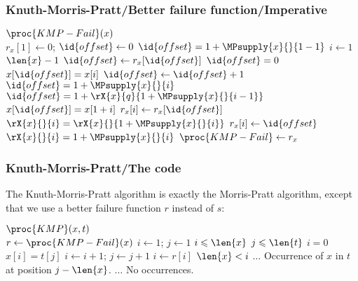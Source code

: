 %
\begin{frame}
\frametitle{Knuth-Morris-Pratt/Better failure function/Imperative}

{\small
\begin{codebox}
\(\proc{KMP-Fail} (x)\)\\
\li \(r_{x}[1] \gets 0\); \(\id{offset} \gets 0\)
    \RComment \(\id{offset} = 1 + \MPsupply{x}{}{1-1}\)
\li \For \(i \gets 1\) \To \(\len{x}-1\) 
\li \Do \Repeat
\li       \(\id{offset} \gets r_{x}[\id{offset}]\)
\li     \Until \(\id{offset} = 0\) \LogOr \(x[\id{offset}] = x[i]\)
\li     \(\id{offset} \gets \id{offset} + 1\)
        \RComment \(\id{offset} = 1 + \MPsupply{x}{}{i}\)
\li     \RComment \(\id{offset} = 1 + \rX{x}{q}{1+\MPsupply{x}{}{i-1}}\)
\li     \If \(x[\id{offset}] = x[1+i]\)
\li     \Then \(r_{x}[i] \gets r_{x}[\id{offset}]\)
              \RComment \(\rX{x}{}{i} = \rX{x}{}{1+\MPsupply{x}{}{i}}\)
\li     \Else \(r_{x}[i] \gets \id{offset}\)
              \RComment \(\rX{x}{}{i} = 1 + \MPsupply{x}{}{i}\)
        \End
    \End
\li \(\proc{KMP-Fail} \gets r_{x}\)
\end{codebox}
}

\end{frame}

%
\begin{frame}
\frametitle{Knuth-Morris-Pratt/The code}

The Knuth-Morris-Pratt algorithm is exactly the Morris-Pratt
algorithm, except that we use a better failure function \(r\) instead
of \(s\):
\begin{codebox}
\(\proc{KMP} (x, t)\)\\
\li \(r \gets \proc{KMP-Fail} (x)\)
\li \(i \gets 1\); \(j \gets 1\)
\li \While \(i \leqslant \len{x}\) \LogAnd \(j \leqslant \len{t}\)
\li \Do \If \(i = 0\) \LogOr \(x[i] = t[j]\)
\li	\Then \(i \gets i + 1\); \(j \gets j + 1\)
\li	\Else \(i \gets r[i]\)
        \End
    \End
\li \If \(\len{x} < i\) 
\li \Then \(\ldots\) \RComment Occurrence of \(x\) in \(t\) at position \(j - \len{x}\).
\li \Else \(\ldots\) \RComment No occurrences. 
    \End
\end{codebox}

\end{frame}

